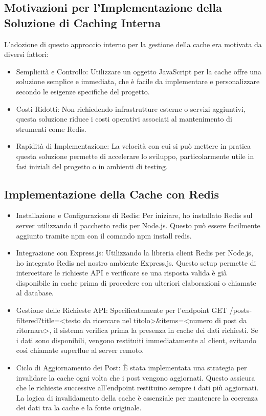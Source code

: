 \documentclass[12pt]{article}
\begin{document}
\subsection{Motivazioni per l'Implementazione della Soluzione di Caching Interna}
L'adozione di questo approccio interno per la gestione della cache era motivata da diversi fattori:
\begin{itemize}
\item Semplicità e Controllo: Utilizzare un oggetto JavaScript per la cache offre una soluzione semplice e immediata, che è facile da implementare e personalizzare secondo le esigenze specifiche del progetto.
\item Costi Ridotti: Non richiedendo infrastrutture esterne o servizi aggiuntivi, questa soluzione riduce i costi operativi associati al mantenimento di strumenti come Redis.
\item Rapidità di Implementazione: La velocità con cui si può mettere in pratica questa soluzione permette di accelerare lo sviluppo, particolarmente utile in fasi iniziali del progetto o in ambienti di testing.
\end{itemize}

\subsection{Implementazione della Cache con Redis}
\begin{itemize}
\item Installazione e Configurazione di Redis: Per iniziare, ho installato Redis sul server utilizzando il pacchetto redis per Node.js. Questo può essere facilmente aggiunto tramite npm con il comando npm install redis.
\item Integrazione con Express.js: Utilizzando la libreria client Redis per Node.js, ho integrato Redis nel nostro ambiente Express.js. Questo setup permette di intercettare le richieste API e verificare se una risposta valida è già disponibile in cache prima di procedere con ulteriori elaborazioni o chiamate al database.
\item Gestione delle Richieste API: Specificatamente per l'endpoint GET /posts-filtered?title=<testo da ricercare nel titolo>\&items=<numero di post da ritornare>, il sistema verifica prima la presenza in cache dei dati richiesti. Se i dati sono disponibili, vengono restituiti immediatamente al client, evitando così chiamate superflue al server remoto.
\item Ciclo di Aggiornamento dei Post: È stata implementata una strategia per invalidare la cache ogni volta che i post vengono aggiornati. Questo assicura che le richieste successive all'endpoint restituino sempre i dati più aggiornati. La logica di invalidamento della cache è essenziale per mantenere la coerenza dei dati tra la cache e la fonte originale.
\end{itemize}
\end{document}
